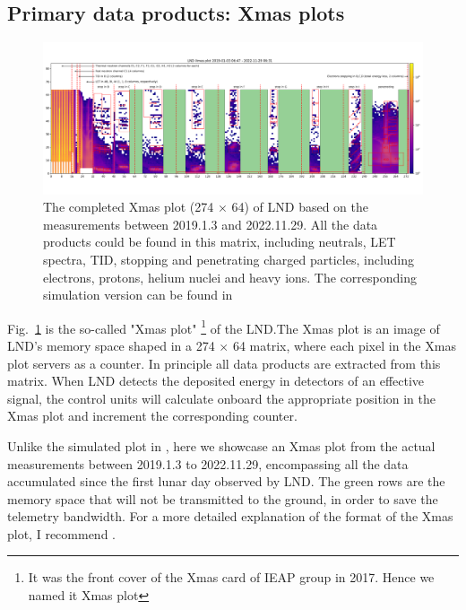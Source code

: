 \subsection{Primary data products: Xmas plots}
\label{sec:xmas}

\begin{figure}
    \centering
    \includegraphics[width =0.95\textheight, height = 0.4\textheight, angle = 90]{images/xmas-2019-01-03To2022-11-29.png}
    \caption[\ac{LND} Xmas plot from measurements]{The completed Xmas plot (274 $\times$ 64) of \ac{LND} based on the measurements between 2019.1.3 and 2022.11.29. All the data products could be found in this matrix, including neutrals, \ac{LET} spectra, \ac{TID}, stopping and penetrating charged particles, including electrons, protons, helium nuclei and heavy ions. The corresponding simulation version can be found in \citep{Wimmer2020SSRv}}
    \label{Fig:measurement_Xmas}
\end{figure}

Fig.~\ref{Fig:measurement_Xmas} is the so-called "Xmas plot" \footnote{It was the front cover of the Xmas card of IEAP group in 2017. Hence we named it Xmas plot} of the \ac{LND}.The Xmas plot is an image of \ac{LND}'s memory space shaped in a 274 $\times$ 64 matrix, where each pixel in the Xmas plot servers as a counter. In principle all data products are extracted from this matrix. 
When \ac{LND} detects the deposited energy in detectors of an effective signal, the control units will calculate onboard the appropriate position in the Xmas plot and increment the corresponding counter. 

Unlike the simulated plot in \citep{Wimmer2020SSRv}, here we showcase an Xmas plot from the actual measurements between 2019.1.3 to 2022.11.29, encompassing all the data accumulated since the first lunar day observed by \ac{LND}. The green rows are the memory space that will not be transmitted to the ground, in order to save the telemetry bandwidth. 
For a more detailed explanation of the format of the Xmas plot, I recommend \citep{Wimmer2020SSRv}.


